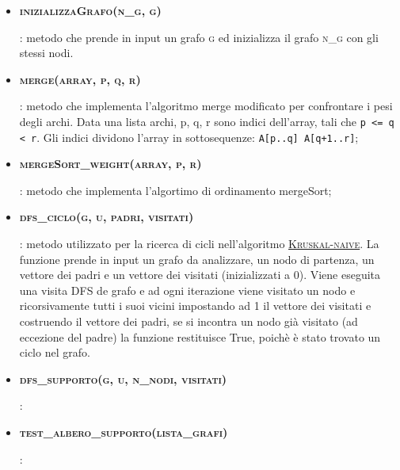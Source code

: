 \begin{itemize}
    
    \item \hypertarget{inizializzagrafo}{\textbf{\textsc{inizializzaGrafo(n\_g, g)}}}: metodo che prende in input un grafo \textsc{g} ed inizializza il grafo \textsc{n\_g} con gli stessi nodi.
    
    \item \hypertarget{merge}{\textbf{\textbf{\textsc{merge(array, p, q, r)}}}}: metodo che implementa l'algoritmo merge modificato per confrontare i pesi degli archi. Data una lista archi, p, q, r sono indici dell'array, tali che \texttt{p <= q < r}. Gli indici dividono l'array in sottosequenze: \texttt{A[p..q] A[q+1..r]};
    
    \item \hypertarget{mergesort}{\textbf{\textsc{mergeSort\_weight(array, p, r)}}}: metodo che implementa l'algortimo di ordinamento mergeSort;
    
    \item \hypertarget{dfsciclo}{\textbf{\textsc{dfs\_ciclo(g, u, padri, visitati)}}}: metodo utilizzato per la ricerca di cicli nell'algoritmo \hyperlink{section.4}{\textsc{Kruskal-naive}}. La funzione prende in input un grafo da analizzare, un nodo di partenza, un vettore dei padri e un vettore dei visitati (inizializzati a 0). Viene eseguita una visita DFS de grafo e ad ogni iterazione viene visitato un nodo e ricorsivamente tutti i suoi vicini impostando ad 1 il vettore dei visitati e costruendo il vettore dei padri, se si incontra un nodo già visitato (ad eccezione del padre) la funzione restituisce True, poichè è stato trovato un ciclo nel grafo.
    
    \item \hypertarget{dfssupporto}{\textbf{\textsc{dfs\_supporto(g, u, n\_nodi, visitati)}}}: 
    
    \item \hypertarget{testalberosupporto}{\textbf{\textsc{test\_albero\_supporto(lista\_grafi)}}}: 
    
    
\end{itemize} 

